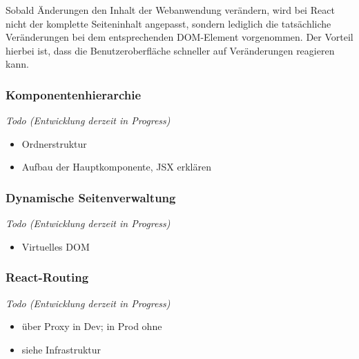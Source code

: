 Sobald Änderungen den Inhalt der Webanwendung verändern, wird bei React nicht der komplette Seiteninhalt angepasst, sondern lediglich die tatsächliche Veränderungen bei dem entsprechenden \ac{DOM}-Element vorgenommen. 
Der Vorteil hierbei ist, dass die Benutzeroberfläche schneller auf Veränderungen reagieren kann. 

\subsubsection{Komponentenhierarchie}
\textit{Todo (Entwicklung derzeit in Progress)}
\begin{itemize}
	\item Ordnerstruktur 
	\item Aufbau der Hauptkomponente, JSX erklären
\end{itemize}
	
\subsubsection{Dynamische Seitenverwaltung}
\textit{Todo (Entwicklung derzeit in Progress)}
\begin{itemize}
	\item Virtuelles \ac{DOM}
\end{itemize}
	
\subsubsection{React-Routing}
\textit{Todo (Entwicklung derzeit in Progress)}
\begin{itemize}
	\item über Proxy in Dev; in Prod ohne
	\item siehe Infrastruktur
\end{itemize}
